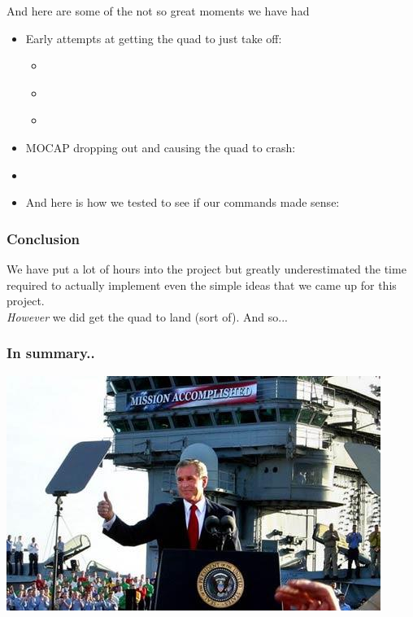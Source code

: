 \documentclass{beamer}
\begin{document}
\begin{frame}
And here are some of the not so great moments we have had
\begin{itemize}
\item Early attempts at getting the quad to just take off: 
	\begin{itemize}
		\item \href{https://youtu.be/a6_0YQt9BuM?t=29}{} \\
		\item \href{https://youtu.be/9zpM9thEneg?t=10}{} \\
		\item \href{https://youtu.be/5U7R6-7MHrY?t=137}{}
	\end{itemize}
\item MOCAP dropping out and causing the quad to crash:
		\item \href{https://youtu.be/ZHCqoEdYbX0?t=30}{}

\item And here is how we tested to see if our commands made sense:
\href{https://youtu.be/0EvrlYkYMyY?t=175}{}

\end{itemize}

\end{frame}

\begin{frame}
\frametitle{Conclusion}
We have put a lot of hours into the project but greatly underestimated the time required to actually implement even the simple ideas that we came up for this project. \\

\textit{However} we did get the quad to land (sort of). And so...
\end{frame}

  \begin{frame}
    \frametitle{In summary..}
    \includegraphics[width=\linewidth]{images/mission_accomplished.jpg}
\end{frame}

\end{document}
